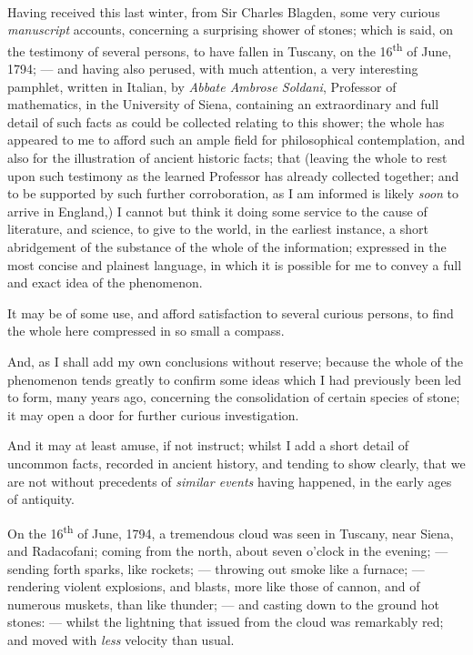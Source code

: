 \documentclass[a4paper, 12pt, oneside, twocolumn]{article}
\begin{document}
\paragraph{}
Having received this last winter, from Sir Charles Blagden, some very curious \emph{manuscript} accounts, concerning a surprising shower of stones; which is said, on the testimony of several persons, to have fallen in Tuscany, on the 16\textsuperscript{th} of June, 1794; --- and having also perused, with much attention, a very interesting pamphlet, written in Italian, by \emph{Abbate Ambrose Soldani}, Professor of mathematics, in the University of Siena, containing an extraordinary and full detail of such facts as could be collected relating to this shower; the whole has appeared to me to afford such an ample field for philosophical contemplation, and also for the illustration of ancient historic facts; that (leaving the whole to rest upon such testimony as the learned Professor has already collected together; and to be supported by such further corroboration, as I am informed is likely \emph{soon} to arrive in England,) I cannot but think it doing some service to the cause of literature, and science, to give to the world, in the earliest instance, a short abridgement of the substance of the whole of the information; expressed in the most concise and plainest language, in which it is possible for me to convey a full and exact idea of the phenomenon.

It may be of some use, and afford satisfaction to several curious persons, to find the whole here compressed in so small a compass.

And, as I shall add my own conclusions without reserve; because the whole of the phenomenon tends greatly to confirm some ideas which I had previously been led to form, many years ago, concerning the consolidation of certain species of stone; it may open a door for further curious investigation.

And it may at least amuse, if not instruct; whilst I add a short detail of uncommon facts, recorded in ancient history, and tending to show clearly, that we are not without precedents of \emph{similar events} having happened, in the early ages of antiquity.

On the 16\textsuperscript{th} of June, 1794, a tremendous cloud was seen in Tuscany, near Siena, and Radacofani; coming from the north, about seven o'clock in the evening; --- sending forth sparks, like rockets; --- throwing out smoke like a furnace; --- rendering violent explosions, and blasts, more like those of cannon, and of numerous muskets, than like thunder; --- and casting down to the ground hot stones: --- whilst the lightning that issued from the cloud was remarkably red; and moved with \emph{less} velocity than usual.
\end{document}
